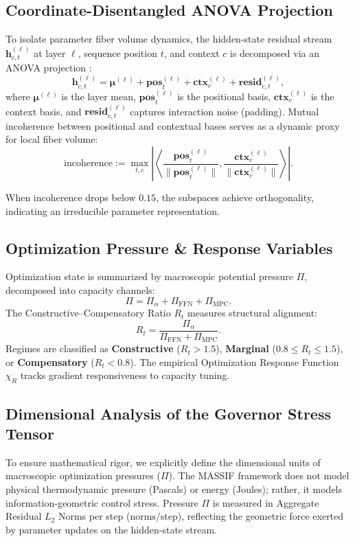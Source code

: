 \documentclass[11pt,twocolumn]{article}
\begin{document}
\subsection{Coordinate-Disentangled ANOVA Projection}
To isolate parameter fiber volume dynamics, the hidden-state residual stream $\mathbf{h}_{c,t}^{(\ell)}$ at layer $\ell$, sequence position $t$, and context $c$ is decomposed via an ANOVA projection \cite{massif}:
\begin{equation} 
\mathbf{h}_{c,t}^{(\ell)} = \boldsymbol{\mu}^{(\ell)} + \mathbf{pos}_t^{(\ell)} + \mathbf{ctx}_c^{(\ell)} + \mathbf{resid}_{c,t}^{(\ell)}, 
\end{equation}
where $\boldsymbol{\mu}^{(\ell)}$ is the layer mean, $\mathbf{pos}_t^{(\ell)}$ is the positional basis, $\mathbf{ctx}_c^{(\ell)}$ is the context basis, and $\mathbf{resid}_{c,t}^{(\ell)}$ captures interaction noise (padding). Mutual incoherence between positional and contextual bases serves as a dynamic proxy for local fiber volume:
\begin{equation} 
\text{incoherence} := \max_{t,c} \left| \left\langle \frac{\mathbf{pos}_t^{(\ell)}}{\|\mathbf{pos}_t^{(\ell)}\|}, \frac{\mathbf{ctx}_c^{(\ell)}}{\|\mathbf{ctx}_c^{(\ell)}\|} \right\rangle \right|. 
\end{equation}

When incoherence drops below $0.15$, the subspaces achieve orthogonality, indicating an irreducible parameter representation.

\subsection{Optimization Pressure \& Response Variables}
Optimization state is summarized by macroscopic potential pressure $\Pi$, decomposed into capacity channels:
\begin{equation}
\Pi = \Pi_\alpha + \Pi_{\mathrm{FFN}} + \Pi_{\mathrm{MPC}}.
\end{equation}
The Constructive--Compensatory Ratio $R_t$ measures structural alignment:
\begin{equation}
R_t = \frac{\Pi_\alpha}{\Pi_{\mathrm{FFN}} + \Pi_{\mathrm{MPC}}}.
\end{equation}
Regimes are classified as \textbf{Constructive} ($R_t > 1.5$), \textbf{Marginal} ($0.8 \le R_t \le 1.5$), or \textbf{Compensatory} ($R_t < 0.8$). The empirical Optimization Response Function $\chi_R$ tracks gradient responsiveness to capacity tuning.

\subsection{Dimensional Analysis of the Governor Stress Tensor}
To ensure mathematical rigor, we explicitly define the dimensional units of macroscopic optimization pressures ($\Pi$). The MASSIF framework does not model physical thermodynamic pressure (Pascals) or energy (Joules); rather, it models information-geometric control stress. Pressure $\Pi$ is measured in Aggregate Residual $L_2$ Norms per step ($\text{norms/step}$), reflecting the geometric force exerted by parameter updates on the hidden-state stream.
\end{document}
